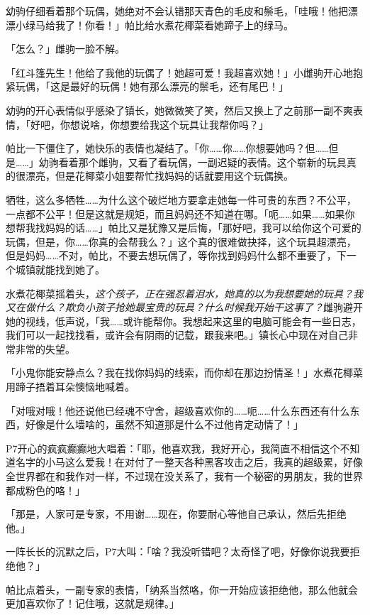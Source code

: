 幼驹仔细看着那个玩偶，她绝对不会认错那天青色的毛皮和鬃毛，「哇哦！他把漂漂小绿马给我了！你看！」帕比给水煮花椰菜看她蹄子上的绿马。

「怎么？」雌驹一脸不解。

「红斗篷先生！他给了我他的玩偶了！她超可爱！我超喜欢她！」小雌驹开心地抱紧玩偶，「这是最好的玩偶！她有那么漂亮的鬃毛，还有尾巴！」

幼驹的开心表情似乎感染了镇长，她微微笑了笑，然后又换上了之前那一副不爽表情，「好吧，你想说啥，你想要给我这个玩具让我帮你吗？」

帕比一下僵住了，她快乐的表情也凝结了。「你……你……你想要她吗？但……但是……」幼驹看着那个雌驹，又看了看玩偶，一副迟疑的表情。这个崭新的玩具真的很漂亮，但是花椰菜小姐要帮忙找妈妈的话就要用这个玩偶换。

牺牲，这么多牺牲……为什么这个破烂地方要拿走她每一件可贵的东西？不公平，一点都不公平！但是这就是规矩，而且妈妈还不知道在哪。「呃……如果……如果你想帮我找妈妈的话……」帕比又是犹豫又是后悔，「那好吧，我可以给你这个可爱的玩偶，但是，你……你真的会帮我么？」这个真的很难做抉择，这个玩具超漂亮，但是妈妈……不对，帕比，不要去想玩偶了，等你找到妈妈什么都不重要了，下一个城镇就能找到她了。

水煮花椰菜摇着头，\emph{这个孩子，正在强忍着泪水，她真的以为我想要她的玩具？我又在做什么？欺负小孩子抢她最宝贵的玩具？什么时候我开始干这事了？}雌驹避开她的视线，低声说，「我……或许能帮你。我想起来这里的电脑可能会有一些日志，我们可以一起找找看，或许会有阴雨的记载，跟我来吧。」镇长心中现在对自己非常非常的失望。

\horizonline


「小鬼你能安静点么？我在找你妈妈的线索，而你却在那边扮情圣！」水煮花椰菜用蹄子捂着耳朵懊恼地喊着。

「对哦对哦！他还说他已经魂不守舍，超级喜欢你的……呃……什么东西还有什么东西，好像是什么墙啥的，虽然不知道那是什么不过他肯定动情了！」

P7开心的疯疯癫癫地大唱着：「耶，他喜欢我，我好开心，我简直不相信这个不知道名字的小马这么爱我！在对付了一整天各种黑客攻击之后，我真的超级累，好像全世界都在和我作对一样，不过现在没关系了，我有一个秘密的男朋友，我的世界都成粉色的咯！」

「那是，人家可是专家，不用谢……现在，你要耐心等他自己承认，然后先拒绝他。」

一阵长长的沉默之后，P7大叫：「啥？我没听错吧？太奇怪了吧，好像你说我要拒绝他？」

帕比点着头，一副专家的表情，「纳系当然咯，你一开始应该拒绝他，那么他就会更加喜欢你了！记住哦，这就是规律。」

